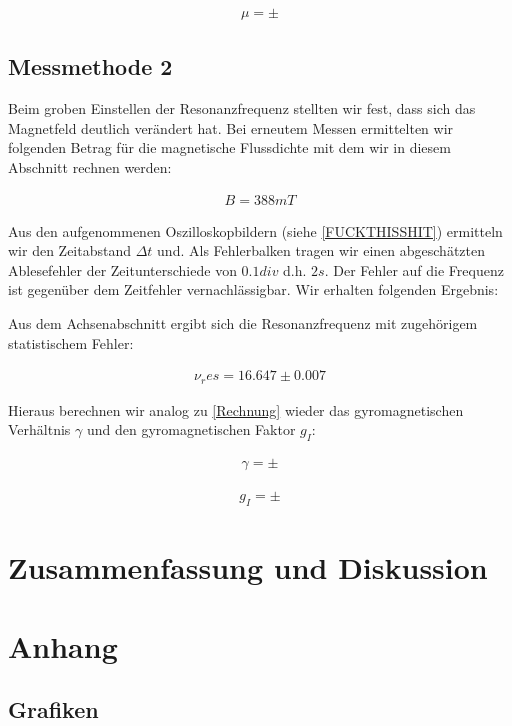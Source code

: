 \documentclass[12pt]{article}
\newcommand{\gra}[3][0.7]{
	\begin{minipage}[h!]{\textwidth}
		\centering
		\texttt{[image: figures/\#2.png]}
		\captionof{figure}{#3}
	\end{minipage}
	\vskip 30 pt
}
\begin{document}
\begin{align*}
\mu =  \pm
\end{align*}
\newpage

\subsection{Messmethode 2}
Beim groben Einstellen der Resonanzfrequenz stellten wir fest, dass sich das Magnetfeld deutlich verändert hat. Bei erneutem Messen ermittelten wir folgenden Betrag für die magnetische Flussdichte mit dem wir in diesem Abschnitt rechnen werden:

\begin{align*}
B = 388 mT
\end{align*}


Aus den aufgenommenen Oszilloskopbildern (siehe \ref{FUCKTHISSHIT}) ermitteln wir den Zeitabstand $\Delta t$ und. Als Fehlerbalken tragen wir einen abgeschätzten Ablesefehler der Zeitunterschiede von $0.1 div$ d.h. $2s$. Der Fehler auf die Frequenz ist gegenüber dem Zeitfehler vernachlässigbar.
Wir erhalten folgenden Ergebnis:




Aus dem Achsenabschnitt ergibt sich die Resonanzfrequenz mit zugehörigem statistischem Fehler:

\begin{align*}
\nu_res = 16.647   \pm 0.007
\end{align*}   

Hieraus berechnen wir analog zu \ref{Rechnung} wieder das gyromagnetischen Verhältnis $\gamma$ und den gyromagnetischen Faktor $g_I$:

\begin{align*}
\gamma =  \pm
\end{align*}

\begin{align*}
g_I =   \pm
\end{align*}

\section{Zusammenfassung und Diskussion}


\newpage
\section{Anhang} 

\subsection{Grafiken}
\end{document}
